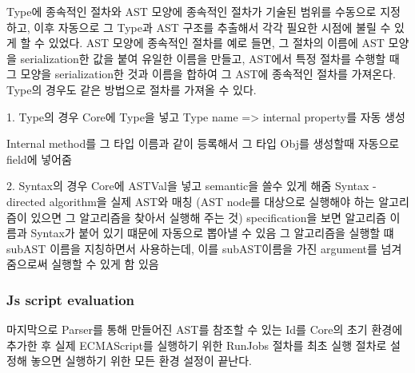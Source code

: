 Type에 종속적인 절차와 AST 모양에 종속적인 절차가 기술된 범위를 수동으로 지정하고, 이후 자동으로 그 Type과 AST 구조를 추출해서 각각 필요한 시점에 불릴 수 있게 할 수 있었다. AST 모양에 종속적인 절차를 예로 들면, 그 절차의 이름에 AST 모양을 serialization한 값을 붙여 유일한 이름을 만들고, AST에서 특정 절차를 수행할 때 그 모양을 serialization한 것과 이름을 합하여 그 AST에 종속적인 절차를 가져온다. Type의 경우도 같은 방법으로 절차를 가져올 수 있다.

1. Type의 경우 Core에 Type을 넣고 Type name => internal property를 자동 생성

Internal method를 그 타입 이름과 같이 등록해서 그 타입 Obj를 생성할때 자동으로 field에 넣어줌

2. Syntax의 경우 Core에 ASTVal을 넣고 semantic을 쓸수 있게 해줌
Syntax - directed algorithm을 실제 AST와 매칭 (AST node를 대상으로 실행해야 하는 알고리즘이 있으면 그 알고리즘을 찾아서 실행해 주는 것)
specification을 보면 알고리즘 이름과 Syntax가 붙어 있기 떄문에 자동으로 뽑아낼 수 있음
그 알고리즘을 실행할 떄 subAST 이름을 지칭하면서 사용하는데, 이를 subAST이름을 가진 argument를 넘겨줌으로써 실행할 수 있게 함
있음



\subsubsection{Js script evaluation}
 마지막으로 Parser를 통해 만들어진 AST를 참조할 수 있는 Id를 Core의 초기 환경에 추가한 후 실제 ECMAScript를 실행하기 위한 RunJobs 절차를 최초 실행 절차로 설정해 놓으면 실행하기 위한 모든 환경 설정이 끝난다.


